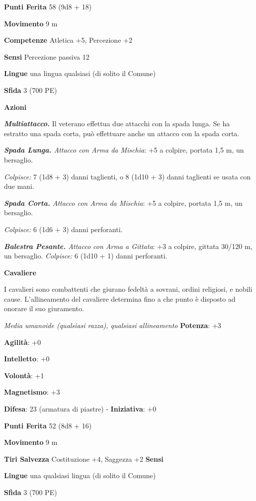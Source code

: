 \begin{multicols}{2}
\textbf{Punti Ferita} 58 (9d8 + 18)

\textbf{Movimento} 9 m

\textbf{Competenze} Atletica +5, Percezione +2

\textbf{Sensi} Percezione passiva 12

\textbf{Lingue} una lingua qualsiasi (di solito il Comune)

\textbf{Sfida} 3 (700 PE)

\textbf{Azioni}

\emph{\textbf{Multiattacco.}} Il veterano effettua due attacchi con la
spada lunga. Se ha estratto una spada corta, può effettuare anche un
attacco con la spada corta.

\emph{\textbf{Spada Lunga.} Attacco con Arma da Mischia}: +5 a colpire,
portata 1,5 m, un bersaglio.

\emph{Colpisce:} 7 (1d8 + 3) danni taglienti, o 8 (1d10 + 3) danni
taglienti se usata con due mani.

\emph{\textbf{Spada Corta.} Attacco con Arma da Mischia}: +5 a colpire,
portata 1,5 m, un bersaglio.

\emph{Colpisce:} 6 (1d6 + 3) danni perforanti.

\emph{\textbf{Balestra Pesante.} Attacco con Arma a Gittata}: +3 a
colpire, gittata 30/120 m, un bersaglio. \emph{Colpisce:} 6 (1d10 + 1)
danni perforanti.

\textbf{Cavaliere}

I cavalieri sono combattenti che giurano fedeltà a sovrani, ordini
religiosi, e nobili cause. L'allineamento del cavaliere determina fino a
che punto è disposto ad onorare il suo giuramento.

\emph{Media umanoide (qualsiasi razza), qualsiasi allineamento}
\textbf{Potenza}: +3

\textbf{Agilità}: +0

\textbf{Intelletto}: +0

\textbf{Volontà}: +1

\textbf{Magnetismo}: +3

\textbf{Difesa}: 23 (armatura di piastre) - \textbf{Iniziativa}: +0

\textbf{Punti Ferita} 52 (8d8 + 16)

\textbf{Movimento} 9 m

\textbf{Tiri Salvezza} Costituzione +4, Saggezza +2 \textbf{Sensi}


\textbf{Lingue} una qualsiasi lingua (di solito il Comune)

\textbf{Sfida} 3 (700 PE)


\end{multicols}
